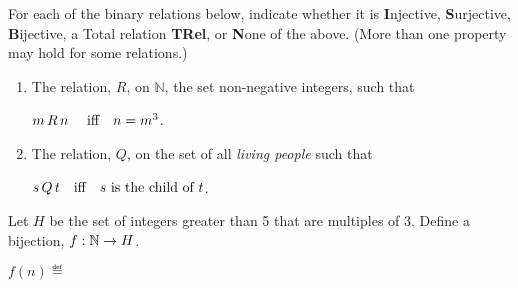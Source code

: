 \documentclass[quiz]{mcs}
\begin{document}


\begin{problem}[2]
For each of the binary relations below, indicate whether it is
\textbf{I}njective, \textbf{S}urjective, \textbf{B}ijective, a Total relation
\textbf{TRel}, or \textbf{N}one of the above.  (More than one property may
hold for some relations.)

\begin{enumerate}

\item The relation, $R$, on $\mathbb{N}$,
the set non-negative integers, such that

$m\, R\, n\ \quad \text{iff} \quad n=m^3$. \hfill \brule{1.5in}


\item The relation, $Q$, on the set of all {\it living people}
such that

$s\, Q\, t  \quad \text{iff} \quad s \text{ is the child of } t$.
\hfill\brule{1.5in}


\end{enumerate}

\end{problem}


\iffalse
\fi

\begin{problem}[2]  Let $H$ be the set of integers greater than 5 that are
multiples of 3.  Define a bijection, $f:\mathbb{N} \to H$.

$f(n) \eqdef$ \brule{2in}


\end{problem}
\end{document}
